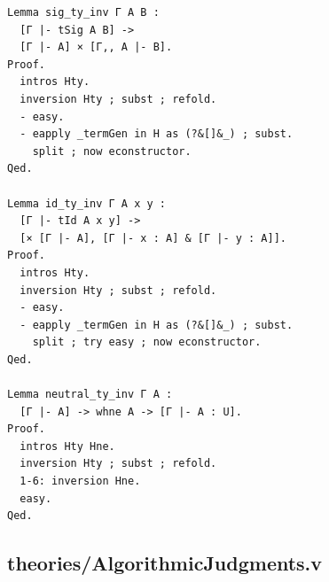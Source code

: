 \documentclass[10pt,a4paper]{amsart}
\begin{document}
\begin{lstlisting}
Lemma sig_ty_inv Γ A B :
  [Γ |- tSig A B] ->
  [Γ |- A] × [Γ,, A |- B].
Proof.
  intros Hty.
  inversion Hty ; subst ; refold.
  - easy.
  - eapply _termGen in H as (?&[]&_) ; subst.
    split ; now econstructor.
Qed.

Lemma id_ty_inv Γ A x y :
  [Γ |- tId A x y] ->
  [× [Γ |- A], [Γ |- x : A] & [Γ |- y : A]].
Proof.
  intros Hty.
  inversion Hty ; subst ; refold.
  - easy.
  - eapply _termGen in H as (?&[]&_) ; subst.
    split ; try easy ; now econstructor.
Qed.

Lemma neutral_ty_inv Γ A :
  [Γ |- A] -> whne A -> [Γ |- A : U].
Proof.
  intros Hty Hne.
  inversion Hty ; subst ; refold.
  1-6: inversion Hne.
  easy.
Qed.
\end{lstlisting}

\subsection*{theories/AlgorithmicJudgments.v}
\end{document}
